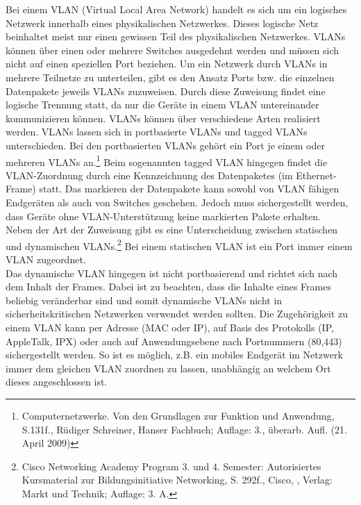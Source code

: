Bei einem VLAN (Virtual Local Area Network) handelt es sich um ein logisches Netzwerk innerhalb eines physikalischen Netzwerkes.
Dieses logische Netz beinhaltet meist nur einen gewissen Teil des physikalischen Netzwerkes.
VLANs können über einen oder mehrere Switches ausgedehnt werden und müssen sich nicht auf einen speziellen Port beziehen.
Um ein Netzwerk durch VLANs in mehrere Teilnetze zu unterteilen, gibt es den Ansatz Ports bzw. die einzelnen Datenpakete jeweils VLANs zuzuweisen.
Durch diese Zuweisung findet eine logische Trennung statt, da nur die Geräte in einem VLAN untereinander kommunizieren können.
VLANs können über verschiedene Arten realisiert werden.
VLANs lassen sich in portbasierte VLANs und tagged VLANs unterschieden.
Bei den portbasierten VLANs gehört ein Port je einem oder mehreren VLANs an.\footnote{Computernetzwerke. Von den Grundlagen zur Funktion und Anwendung, S.131f., Rüdiger Schreiner, Hanser Fachbuch; Auflage: 3., überarb. Aufl. (21. April 2009)}
Beim sogenannten tagged VLAN hingegen findet die VLAN-Zuordnung durch eine Kennzeichnung des Datenpaketes (im Ethernet-Frame) statt.
Das markieren der Datenpakete kann sowohl von VLAN fähigen Endgeräten als auch von Switches geschehen.
Jedoch muss sichergestellt werden, dass Geräte ohne VLAN-Unterstützung keine markierten Pakete erhalten.\\
Neben der Art der Zuweisung gibt es eine Unterscheidung zwischen statischen und dynamischen VLANs.\footnote{Cisco Networking Academy Program 3. und 4. Semester: Autorisiertes Kursmaterial zur Bildungsinitiative Networking, S. 292f., Cisco, , Verlag: Markt und Technik; Auflage: 3. A. }
Bei einem statischen VLAN ist ein Port immer einem VLAN zugeordnet.
\\
Das dynamische VLAN hingegen ist nicht portbasierend und richtet sich nach dem Inhalt der Frames.
Dabei ist zu beachten, dass die Inhalte eines Frames beliebig veränderbar sind und somit dynamische VLANs nicht in sicherheitskritischen Netzwerken verwendet werden sollten.
Die Zugehörigkeit zu einem VLAN kann per Adresse (MAC oder IP), auf Basis des Protokolls (IP, AppleTalk, IPX) oder auch auf Anwendungsebene nach Portnummern (80,443) sichergestellt werden.
So ist es möglich, z.B. ein mobiles Endgerät im Netzwerk immer dem gleichen VLAN zuordnen zu lassen, unabhängig an welchem Ort dieses angeschlossen ist.\\

